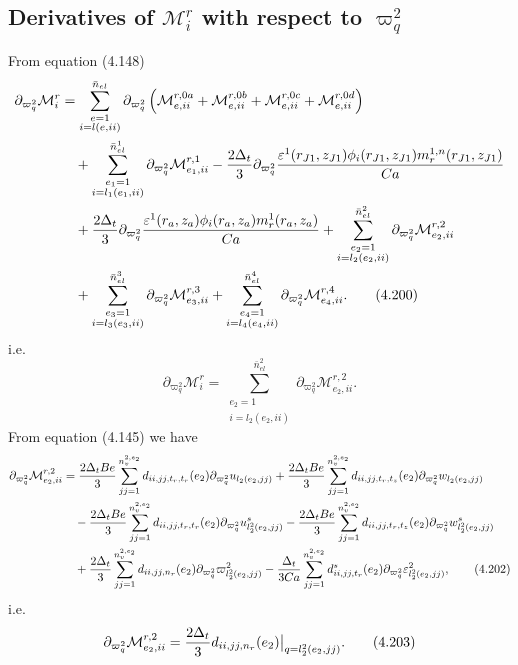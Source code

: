 \documentclass{article}
\begin{document}
\subsection{Derivatives of $\mathcal{M}_i^r$ with respect to $\varpi_q^2$} %
From equation (4.148)
\begin{align}
\partial_{\varpi_q^2}\mathcal{M}_i^r &= \sum_{\substack{e=1\\ i=l(e,ii)}}^{\bar{n}_{el}} \partial_{\varpi_q^2} \left( \mathcal{M}_{e,ii}^{r,0a} + \mathcal{M}_{e,ii}^{r,0b} + \mathcal{M}_{e,ii}^{r,0c} + \mathcal{M}_{e,ii}^{r,0d} \right) \nonumber\\
&\quad + \sum_{\substack{e_1=1\\ i=l_1(e_1,ii)}}^{\bar{n}_{el}^1} \partial_{\varpi_q^2} \mathcal{M}_{e_1,ii}^{r,1} 
- \frac{2\Delta_t}{3} \partial_{\varpi_q^2} \frac{\varepsilon^1(r_{J1},z_{J1}) \phi_i(r_{J1},z_{J1}) m_r^{1,n}(r_{J1},z_{J1})}{Ca} \nonumber\\
&\quad + \frac{2\Delta_t}{3} \partial_{\varpi_q^2} \frac{\varepsilon^1(r_a,z_a) \phi_i(r_a,z_a) m_r^{1}(r_a,z_a)}{Ca} 
+ \sum_{\substack{e_2=1\\ i=l_2(e_2,ii)}}^{\bar{n}_{el}^2} \partial_{\varpi_q^2} \mathcal{M}_{e_2,ii}^{r,2} \nonumber\\
&\quad + \sum_{\substack{e_3=1\\ i=l_3(e_3,ii)}}^{\bar{n}_{el}^3} \partial_{\varpi_q^2} \mathcal{M}_{e_3,ii}^{r,3} 
+ \sum_{\substack{e_4=1\\ i=l_4(e_4,ii)}}^{\bar{n}_{el}^4} \partial_{\varpi_q^2} \mathcal{M}_{e_4,ii}^{r,4}. \tag{4.200}
\end{align}
i.e.
\begin{equation}
\partial_{\varpi_q^2}\mathcal{M}_i^r = \sum_{\substack{e_2=1\\ i=l_2(e_2,ii)}}^{\bar{n}_{el}^2} \partial_{\varpi_q^2} \mathcal{M}_{e_2,ii}^{r,2}. \tag{4.201}
\end{equation}
From equation (4.145) we have
\begin{align}
\partial_{\varpi_q^2}\mathcal{M}_{e_2,ii}^{r,2} &= \frac{2\Delta_t Be}{3} \sum_{jj=1}^{n_v^{2,e_2}} d_{ii,jj,t_r,t_r}(e_2) \partial_{\varpi_q^2} u_{l_2(e_2,jj)} 
+ \frac{2\Delta_t Be}{3} \sum_{jj=1}^{n_v^{2,e_2}} d_{ii,jj,t_r,t_z}(e_2) \partial_{\varpi_q^2} w_{l_2(e_2,jj)} \nonumber\\
&\quad - \frac{2\Delta_t Be}{3} \sum_{jj=1}^{n_v^{2,e_2}} d_{ii,jj,t_r,t_r}(e_2) \partial_{\varpi_q^2} u_{l_2^2(e_2,jj)}^s 
- \frac{2\Delta_t Be}{3} \sum_{jj=1}^{n_v^{2,e_2}} d_{ii,jj,t_r,t_z}(e_2) \partial_{\varpi_q^2} w_{l_2^2(e_2,jj)}^s \nonumber\\
&\quad + \frac{2\Delta_t}{3} \sum_{jj=1}^{n_v^{2,e_2}} d_{ii,jj,n_r}(e_2) \partial_{\varpi_q^2} \varpi_{l_2^2(e_2,jj)}^2 
- \frac{\Delta_t}{3Ca} \sum_{jj=1}^{n_v^{2,e_2}} d_{ii,jj,t_r}^s(e_2) \partial_{\varpi_q^2} \varepsilon_{l_2^2(e_2,jj)}^2, \tag{4.202}
\end{align}
i.e.
\begin{equation}
\partial_{\varpi_q^2}\mathcal{M}_{e_2,ii}^{r,2} = \frac{2\Delta_t}{3} d_{ii,jj,n_r}(e_2) \big|_{q=l_2^2(e_2,jj)}. \tag{4.203}
\end{equation}
\end{document}
